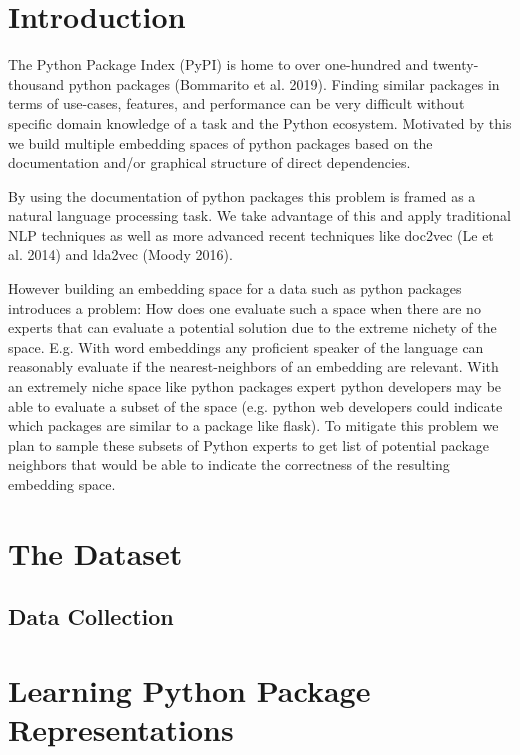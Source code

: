 \documentclass{article}
\begin{document}
\section{Introduction}
The Python Package Index (PyPI) is home to over one-hundred and twenty-thousand python packages (Bommarito et al. 2019). Finding similar packages in terms of use-cases, features, and performance can be very difficult without specific domain knowledge of a task and the Python ecosystem. Motivated by this we build multiple embedding spaces of python packages based on the documentation and/or graphical structure of direct dependencies.

By using the documentation of python packages this problem is framed as a natural language processing task. We take advantage of this and apply traditional NLP techniques as well as more advanced recent techniques like doc2vec (Le et al. 2014) and lda2vec (Moody 2016). 

However building an embedding space for a data such as python packages introduces a problem: How does one evaluate such a space when there are no experts that can evaluate a potential solution due to the extreme nichety of the space. E.g. With word embeddings any proficient speaker of the language can reasonably evaluate if the nearest-neighbors of an embedding are relevant. With an extremely niche space like python packages expert python developers may be able to evaluate a subset of the space (e.g. python web developers could indicate which packages are similar to a package like flask). To mitigate this problem we plan to sample these subsets of Python experts to get list of potential package neighbors that would be able to indicate the correctness of the resulting embedding space.


\section{The Dataset}

\subsection{Data Collection}

\section{Learning Python Package Representations}
\end{document}
